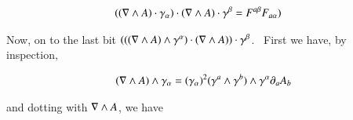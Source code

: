 \documentclass{article}
\begin{document}
\begin{align}\label{eqn:firstPartDone}
((\nabla \wedge A) \cdot \gamma_\alpha) \cdot (\nabla \wedge A) \cdot \gamma^{\beta} 
&= F^{a \beta} F_{a \alpha} ) 
\end{align}

Now, on to the last bit
$(((\nabla \wedge A) \wedge \gamma^\alpha) \cdot (\nabla \wedge A)) \cdot \gamma^\beta$.  First we have, by inspection,

\begin{align*}
(\nabla \wedge A) \wedge \gamma_\alpha
&= (\gamma_\alpha)^2 (\gamma^{a} \wedge \gamma^{b}) \wedge \gamma^{\alpha} \partial_{a} A_{b} \\
\end{align*}

and dotting with $\nabla \wedge A$, we have
\end{document}
